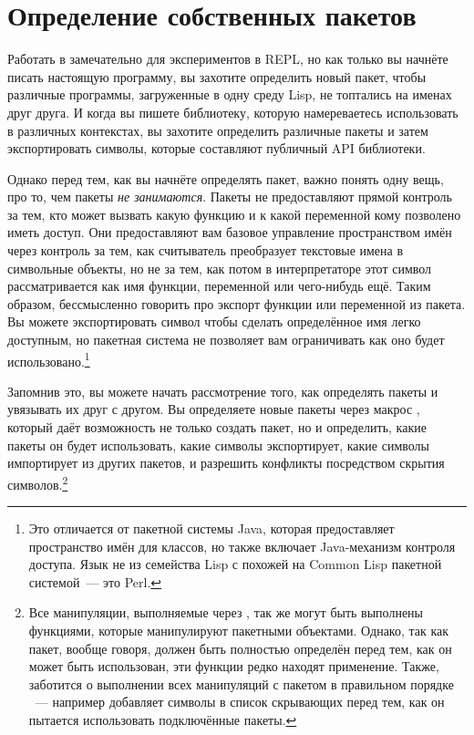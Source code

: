 \section{Определение собственных пакетов}

Работать в  замечательно для экспериментов в REPL, но как только вы
начнёте писать настоящую программу, вы захотите определить новый пакет, чтобы различные
программы, загруженные в одну среду Lisp, не топтались на именах друг друга. И когда вы
пишете библиотеку, которую намереваетесь использовать в различных контекстах, вы захотите
определить различные пакеты и затем экспортировать символы, которые составляют публичный
API библиотеки.

Однако перед тем, как вы начнёте определять пакет, важно понять одну вещь, про то, чем
пакеты \textit{не занимаются}. Пакеты не предоставляют прямой контроль за тем, кто может
вызвать какую функцию и к какой переменной кому позволено иметь доступ. Они предоставляют
вам базовое управление пространством имён через контроль за тем, как считыватель
преобразует текстовые имена в символьные объекты, но не за тем, как потом в интерпретаторе
этот символ рассматривается как имя функции, переменной или чего-нибудь ещё. Таким
образом, бессмысленно говорить про экспорт функции или переменной из пакета. Вы можете
экспортировать символ чтобы сделать определённое имя легко доступным, но пакетная система
не позволяет вам ограничивать как оно будет использовано.\footnote{Это отличается от
  пакетной системы Java, которая предоставляет пространство имён для классов, но также
  включает Java-механизм контроля доступа. Язык не из семейства Lisp с похожей на Common
  Lisp пакетной системой~--- это Perl.}

Запомнив это, вы можете начать рассмотрение того, как определять пакеты и увязывать их
друг с другом.  Вы определяете новые пакеты через макрос , который даёт
возможность не только создать пакет, но и определить, какие пакеты он будет использовать,
какие символы экспортирует, какие символы импортирует из других пакетов, и разрешить
конфликты посредством скрытия символов.\footnote{Все манипуляции, выполняемые через
    , так же могут быть выполнены функциями, которые манипулируют
    пакетными объектами. Однако, так как пакет, вообще говоря, должен быть полностью
    определён перед тем, как он может быть использован, эти функции редко находят
    применение. Также,  заботится о выполнении всех манипуляций с пакетом
    в правильном порядке ~--- например  добавляет символы в список
    скрывающих перед тем, как он пытается использовать подключённые пакеты.}

